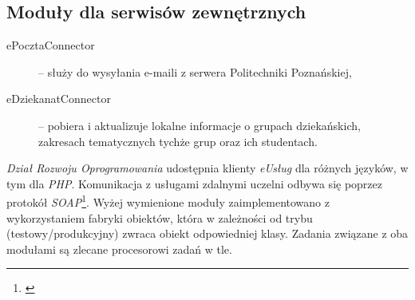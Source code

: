 \subsection{Moduły dla serwisów zewnętrznych}
\begin{description}
\item[ePocztaConnector] -- służy do wysyłania e-maili z serwera Politechniki Poznańskiej,
\item[eDziekanatConnector] -- pobiera i aktualizuje lokalne informacje o grupach dziekańskich, zakresach tematycznych tychże grup oraz ich studentach.
\end{description}

\textit{Dział Rozwoju Oprogramowania} udostępnia klienty \textit{eUsług} dla różnych języków, w tym dla \emph{PHP}. Komunikacja z usługami zdalnymi uczelni odbywa się poprzez protokół \textit{SOAP}\footnote{\cite{W3C:SOAP07}}. Wyżej wymienione moduły zaimplementowano z wykorzystaniem fabryki obiektów, która w zależności od trybu (testowy\slash produkcyjny) zwraca obiekt odpowiedniej klasy. Zadania związane z oba modułami są zlecane procesorowi zadań w tle.